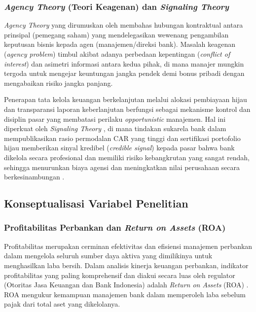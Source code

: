 \documentclass[12pt,a4paper]{article}
\numberwithin{equation}{section}
\begin{document}
\subsubsection{\emph{Agency Theory} (Teori Keagenan) dan \emph{Signaling Theory}}
\noindent
\emph{Agency Theory} yang dirumuskan oleh \citet{JensenMeckling1976} membahas hubungan kontraktual antara prinsipal (pemegang saham) yang mendelegasikan wewenang pengambilan keputusan bisnis kepada agen (manajemen/direksi bank). Masalah keagenan (\emph{agency problem}) timbul akibat adanya perbedaan kepentingan (\emph{conflict of interest}) dan asimetri informasi antara kedua pihak, di mana manajer mungkin tergoda untuk mengejar keuntungan jangka pendek demi bonus pribadi dengan mengabaikan risiko jangka panjang.

\noindent
Penerapan tata kelola keuangan berkelanjutan melalui alokasi pembiayaan hijau dan transparansi laporan keberlanjutan berfungsi sebagai mekanisme kontrol dan disiplin pasar yang membatasi perilaku \emph{opportunistic} manajemen. Hal ini diperkuat oleh \emph{Signaling Theory} \citep{Spence1973}, di mana tindakan sukarela bank dalam mempublikasikan rasio permodalan CAR yang tinggi dan sertifikasi portofolio hijau memberikan sinyal kredibel (\emph{credible signal}) kepada pasar bahwa bank dikelola secara profesional dan memiliki risiko kebangkrutan yang sangat rendah, sehingga menurunkan biaya agensi dan meningkatkan nilai perusahaan secara berkesinambungan \citep{JensenMeckling1976, SetiawanIndrawati2024}.

\subsection{Konseptualisasi Variabel Penelitian}

\subsubsection{Profitabilitas Perbankan dan \emph{Return on Assets} (ROA)}
\noindent
Profitabilitas merupakan cerminan efektivitas dan efisiensi manajemen perbankan dalam mengelola seluruh sumber daya aktiva yang dimilikinya untuk menghasilkan laba bersih. Dalam analisis kinerja keuangan perbankan, indikator profitabilitas yang paling komprehensif dan diakui secara luas oleh regulator (Otoritas Jasa Keuangan dan Bank Indonesia) adalah \emph{Return on Assets} (ROA) \citep{Dendawijaya2015, Riyadi2020}. ROA mengukur kemampuan manajemen bank dalam memperoleh laba sebelum pajak dari total aset yang dikelolanya.
\end{document}
